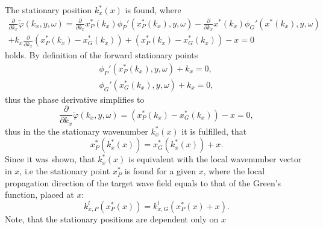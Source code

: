 \documentclass[12pt,a4paper]{article}
\begin{document}
The stationary position $k_x^*(x)$ is found, where
\begin{multline}
\frac{\partial}{\partial k_x}
\tilde{\varphi}(k_x,y,\omega) = \frac{\partial}{\partial k_x}x_P^*(k_x) \phi_P'(x_P^*(k_x),y,\omega) -  \frac{\partial}{\partial k_x} x^*(k_x)\phi_G'(x^*(k_x),y,\omega) \\ + k_x \frac{\partial}{\partial k_x}\left( x_P^*(k_x) - x_G^*(k_x) \right) + \left( x_P^*(k_x) - x_G^*(k_x) \right) -  x = 0
\end{multline}
holds.
By definition of the forward stationary points
\begin{eqnarray}
\phi_P'(x_P^*(k_x),y,\omega) + k_x = 0,\\
\phi_G'(x_G^*(k_x),y,\omega) + k_x = 0,
\label{Forward_spa}
\end{eqnarray}
thus the phase derivative simplifies to
\begin{equation}
\frac{\partial}{\partial k_x}
\tilde{\varphi}(k_x,y,\omega) = \left( x_P^*(k_x) - x_G^*(k_x) \right) -  x = 0,
\end{equation}
thus in the the stationary wavenumber $k_x^*(x)$ it is fulfilled, that 
\begin{equation}
x_P^*(k_x^*(x)) = x_G^*(k_x^*(x)) + x.
\end{equation}
Since it was shown, that $k_x^*(x)$ is equivalent with the local wavenumber vector in $x$, i.e the stationary point $x^*_P$ is found for a given $x$, where the local propagation direction of the target wave field equals to that of the Green's function, placed at $x$:
\begin{equation}
k_{x,P}^l (x_P^*(x)) = k_{x,G}^l(x_P^*(x) + x). 
\end{equation}
Note, that the stationary positions are dependent only on $x$
\end{document}

